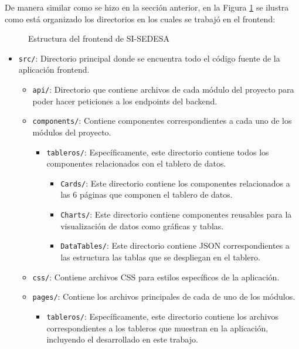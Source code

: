 De manera similar como se hizo en la sección anterior, en la Figura \ref{fig:frontend-estructura} se ilustra como está organizado los directorios en los cuales se trabajó en el frontend:

\begin{figure}[H]
    \caption{Estructura del frontend de SI-SEDESA}
    \label{fig:frontend-estructura}
\end{figure}

\begin{itemize}
    \item \texttt{src/}: Directorio principal donde se encuentra todo el código fuente de la aplicación frontend.
    \begin{itemize}
        \item \texttt{api/}: Directorio que contiene archivos de cada módulo del proyecto para poder hacer peticiones a los endpoints del backend.
        \item \texttt{components/}: Contiene componentes correspondientes a cada uno de los módulos del proyecto.
            \begin{itemize}
                \item \texttt{tableros/}: Específicamente, este directorio contiene todos los componentes relacionados con el tablero de datos.
                    \begin{itemize}
                        \item \texttt{Cards/}: Este directorio contiene los componentes relacionados a las 6 páginas que componen el tablero de datos.
                        \item \texttt{Charts/}: Este directorio contiene componentes reusables para la visualización de datos como gráficas y tablas.

                        \item \texttt{DataTables/}: Este directorio contiene JSON correspondientes a las estructura las tablas que se despliegan en el tablero.
                    \end{itemize}
            \end{itemize}
        \item \texttt{css/}: Contiene archivos CSS para estilos específicos de la aplicación.
        \item \texttt{pages/}: Contiene los archivos principales de cada de uno de los módulos.
            \begin{itemize}
                \item \texttt{tableros/}: Específicamente, este directorio contiene los archivos correspondientes a los tableros que muestran en la aplicación, incluyendo el desarrollado en este trabajo.
            \end{itemize}
    \end{itemize}


\end{itemize}
